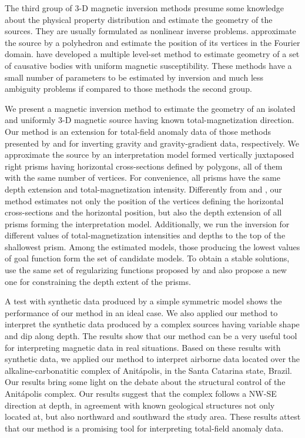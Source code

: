 The third group of 3-D magnetic inversion methods presume some knowledge about the 
physical property distribution and estimate the geometry of the sources. 
They are usually formulated as nonlinear inverse problems. 
\citet{wang_inversion_1990} approximate the source by a polyhedron and estimate 
the position of its vertices in the Fourier domain. 
\citet{wenbin-2017} have developed a multiple level-set method to estimate geometry 
of a set of causative bodies with uniform magnetic susceptibility. 
These methods have a small number of parameters to be estimated by inversion and 
much less ambiguity problems if compared to those methods the second group. 

We present a magnetic inversion method to estimate the geometry of an isolated 
and uniformly 3-D magnetic source having known total-magnetization direction.
Our method is an extension for total-field anomaly data of those methods presented 
by \cite{oliveirajr-etal2011} and \cite{oliveirajr-barbosa2013} for inverting 
gravity and gravity-gradient data, respectively. 
We approximate the source by an interpretation model formed vertically juxtaposed 
right prisms having horizontal cross-sections defined by polygons, all
of them with the same number of vertices.
For convenience, all prisms have the same depth extension and total-magnetization 
intensity.
Differently from \cite{oliveirajr-etal2011} and \cite{oliveirajr-barbosa2013}, 
our method estimates not only the position of the vertices defining the horizontal 
cross-sections and the horizontal position, but also the depth extension of all 
prisms forming the interpretation model. Additionally, we run the inversion for 
different values of total-magnetization intensities and depths to the top 
of the shallowest prism. Among the estimated models, those producing the 
lowest values of goal function form the set of candidate models.
To obtain a stable solutions, use the same set of regularizing functions proposed by 
\cite{oliveirajr-etal2011} and also propose a new one for constraining the 
depth extent of the prisms. 

A test with synthetic data produced by a simple symmetric model shows the performance 
of our method in an ideal case. We also applied our method to interpret the synthetic 
data produced by a complex sources having variable shape and dip along depth. The 
results show that our method can be a very useful tool for interpreting magnetic data 
in real situations. Based on these results with synthetic data, we applied our method 
to interpret airborne data located over the alkaline-carbonatitic complex of 
Anit{\'a}polis, in the Santa Catarina state, Brazil. Our results bring some light 
on the debate about the structural control of the Anit{\'a}polis complex. 
Our results suggest that the complex follows a NW-SE direction at depth, in agreement 
with known geological structures not only located at, but also northward and southward 
the study area. These results attest that our method is a promising tool for interpreting 
total-field anomaly data.